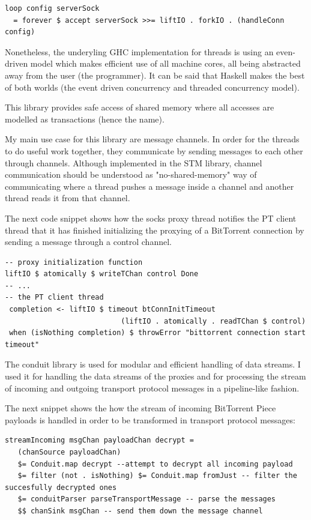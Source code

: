 \documentclass[11pt]{article} %
\begin{document}
\begin{lstlisting}
loop config serverSock
  = forever $ accept serverSock >>= liftIO . forkIO . (handleConn config)
\end{lstlisting}

Nonetheless, the underyling GHC implementation for threads is using an even-driven model which makes efficient use of all machine cores, all being abstracted away from the user (the programmer). It can be said that Haskell makes the best of both worlds (the event driven concurrency and threaded concurrency model).

This library provides safe access of shared memory where all accesses are modelled as transactions (hence the name).

My main use case for this library are message channels. In order for the threads to do useful work together, they communicate by sending messages to each other through channels. Although implemented in the STM library, channel communication should be understood as "no-shared-memory" way of communicating where a thread pushes a message inside a channel and another thread reads it from that channel.

The next code snippet shows how the socks proxy thread notifies the PT client thread that it has finished initializing the proxying of a BitTorrent connection by sending a message through a control channel.
\begin{lstlisting}
-- proxy initialization function
liftIO $ atomically $ writeTChan control Done
-- ...
-- the PT client thread 
 completion <- liftIO $ timeout btConnInitTimeout
		                   (liftIO . atomically . readTChan $ control)
 when (isNothing completion) $ throwError "bittorrent connection start timeout"
\end{lstlisting}


The conduit library is used for modular and efficient handling of data streams. I used it for handling the data streams of the proxies and for processing the stream of incoming and outgoing transport protocol messages  in a pipeline-like fashion.

The next snippet shows the how the stream of incoming BitTorrent Piece payloads is handled in order to be transformed in transport protocol messages:

\begin{lstlisting}
streamIncoming msgChan payloadChan decrypt =
   (chanSource payloadChan)
   $= Conduit.map decrypt --attempt to decrypt all incoming payload
   $= filter (not . isNothing) $= Conduit.map fromJust -- filter the succesfully decrypted ones
   $= conduitParser parseTransportMessage -- parse the messages
   $$ chanSink msgChan -- send them down the message channel
\end{lstlisting}
\end{document}
